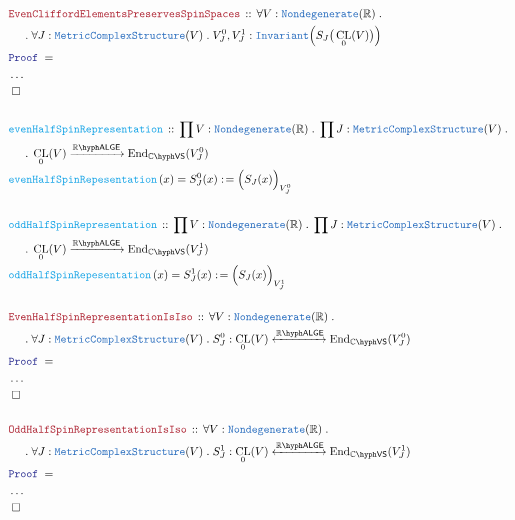 \documentclass[12pt]{scrartcl}%
\newcommand{\TYPE}[1]{\textcolor{NavyBlue}{\mathtt{#1}}}%
\newcommand{\FUNC}[1]{\textcolor{Cerulean}{\mathtt{#1}}}%
\newcommand{\LOGIC}[1]{\textcolor{Blue}{\mathtt{#1}}}%
\newcommand{\THM}[1]{\textcolor{Maroon}{\mathtt{#1}}}%
\renewcommand{\.}{\; . \;} %
\newcommand{\de}{: \kern 0.1pc =} %
\newcommand{\Act}[1]{\left( #1 \right)} %
\newcommand{\Theorem}[2]{& \THM{#1} \, :: \, #2 \\ & \Proof = \\ } %
\newcommand{\DeclareFunc}[2]{& \FUNC{#1} \, :: \, #2 \\}%
\newcommand{\DefineNamedFunc}[4]{&  \FUNC{#1}\Act{#2} = #3 \de #4 \\}%
\newcommand{\NewLine}{\\ & \kern 1pc}%
\newcommand{\Page}[1]{ \begin{align*} #1 \end{align*}  }%
\newcommand{\NoProof}{ & \ldots \\ \EndProof}%
\newcommand{\Reals}{\mathbb{R}}%
\newcommand{\Complex}{\mathbb{C}}%
\newcommand{\End}{\mathrm{End}}%
\newcommand{\QED}{\; \square} %
\newcommand{\EndProof}{& \QED \\} %
\newcommand{\Proof}{\LOGIC{Proof} \; } %
\newcommand{\Arrow}[1]{\xrightarrow{#1}}%
\newcommand{\ToIso}[1]{\xleftrightarrow{#1}}%
\newcommand{\VS}[1]{#1\hyph\mathsf{VS}} %
\newcommand{\LALGE}[1]{#1\hyph\mathsf{ALGE}}%
\DeclareMathOperator{\CL}{CL}%
\begin{document}
\Page{
	\Theorem{EvenCliffordElementsPreservesSpinSpaces}
	{
		\forall V : \TYPE{Nondegenerate}(\Reals) \. \NewLine \.
		\forall J : \TYPE{MetricComplexStructure}(V) \. 
		V_J^0, V_J^1 : \TYPE{Invariant}\Big( S_J\big( \CL_0(V)  \big) \Big)
	}
	\NoProof
	\\
	\DeclareFunc{evenHalfSpinRepresentation}
	{
		\prod V : \TYPE{Nondegenerate}(\Reals) \. 
		\prod J : \TYPE{MetricComplexStructure}(V) \. \NewLine \. 
		\CL_0(V) \Arrow{\LALGE{\Reals}} \End_{\VS{\Complex}}(V_J^0)
	}
	\DefineNamedFunc{evenHalfSpinRepesentation}{x}{S^0_J(x)}
	{ \Big(S_J(x)\Big)_{V_J^0} }
	\\
	\DeclareFunc{oddHalfSpinRepresentation}
	{
		\prod V : \TYPE{Nondegenerate}(\Reals) \. 
		\prod J : \TYPE{MetricComplexStructure}(V) \. \NewLine \. 
		\CL_0(V) \Arrow{\LALGE{\Reals}} \End_{\VS{\Complex}}(V_J^1)
	}
	\DefineNamedFunc{oddHalfSpinRepesentation}{x}{S^1_J(x)}
	{ \Big(S_J(x)\Big)_{V_J^1} }
	\\
	\Theorem{EvenHalfSpinRepresentationIsIso}
	{
		\forall V : \TYPE{Nondegenerate}(\Reals) \. \NewLine \.
		\forall J : \TYPE{MetricComplexStructure}(V) \. 
		S_J^0 : \CL_0(V) \ToIso{\LALGE{\Reals}} \End_{\VS{\Complex}}(V_J^0)	     }
	\NoProof
	\\
	\Theorem{OddHalfSpinRepresentationIsIso}
	{
		\forall V : \TYPE{Nondegenerate}(\Reals) \. \NewLine \.
		\forall J : \TYPE{MetricComplexStructure}(V) \. 
		S_J^1 : \CL_0(V) \ToIso{\LALGE{\Reals}} \End_{\VS{\Complex}}(V_J^1)	     }
	\NoProof
}
\newpage
\end{document}
